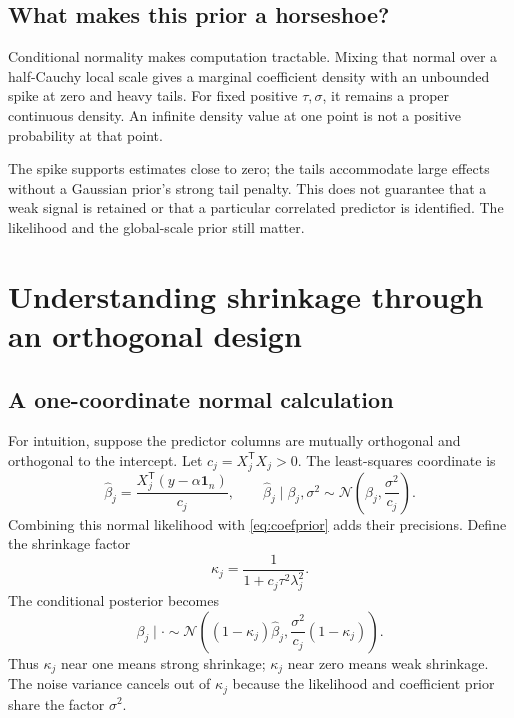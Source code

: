 \documentclass[11pt,letterpaper]{article}
\numberwithin{equation}{section}
\newcommand{\Normal}{\mathcal{N}}
\newcommand{\given}{\mid}
\newcommand{\ones}{\mathbf{1}}
\newcommand{\trans}{^{\mathsf T}}
\begin{document}
\subsection{What makes this prior a horseshoe?}

Conditional normality makes computation tractable. Mixing that normal over a
half-Cauchy local scale gives a marginal coefficient density with an unbounded
spike at zero and heavy tails. For fixed positive \(\tau,\sigma\), it remains
a proper continuous density. An infinite density value at one point is not a
positive probability at that point.

The spike supports estimates close to zero; the tails accommodate large
effects without a Gaussian prior's strong tail penalty. This does not guarantee
that a weak signal is retained or that a particular correlated predictor is
identified. The likelihood and the global-scale prior still matter.

\section{Understanding shrinkage through an orthogonal design}\label{sec:shrinkage}

\subsection{A one-coordinate normal calculation}

For intuition, suppose the predictor columns are mutually orthogonal and
orthogonal to the intercept. Let \(c_j=X_j\trans X_j>0\). The least-squares
coordinate is
\[
 \widehat\beta_j=\frac{X_j\trans(y-\alpha\ones_n)}{c_j},
 \qquad
 \widehat\beta_j\given\beta_j,\sigma^2\sim
 \Normal\left(\beta_j,\frac{\sigma^2}{c_j}\right).
\]
Combining this normal likelihood with \eqref{eq:coefprior} adds their
precisions. Define the shrinkage factor
\begin{equation}\label{eq:kappa}
 \kappa_j=\frac{1}{1+c_j\tau^2\lambda_j^2}.
\end{equation}
The conditional posterior becomes
\begin{equation}\label{eq:orthposterior}
 \beta_j\given\cdot\sim
 \Normal\left((1-\kappa_j)\widehat\beta_j,
      \frac{\sigma^2}{c_j}(1-\kappa_j)\right).
\end{equation}
Thus \(\kappa_j\) near one means strong shrinkage; \(\kappa_j\) near zero
means weak shrinkage. The noise variance cancels out of \(\kappa_j\) because
the likelihood and coefficient prior share the factor \(\sigma^2\).
\end{document}
